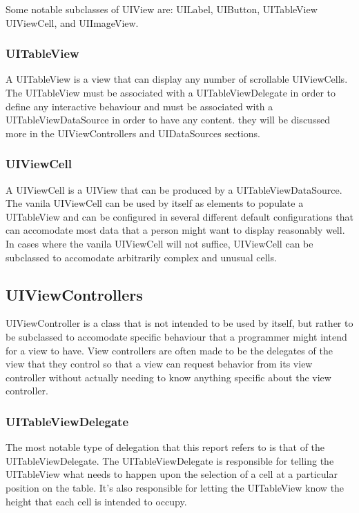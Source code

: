\documentclass[se]{uw-wkrpt}
\begin{document}
Some notable subclasses of UIView are: UILabel, UIButton, UITableView
UIViewCell, and UIImageView.

\subsubsection{UITableView}

A UITableView is a view that can display any number of scrollable 
UIViewCells. The UITableView must be associated with a UITableViewDelegate
in order to define any interactive behaviour and must be associated
with a UITableViewDataSource in order to have any content. they will be
discussed more in the UIViewControllers and UIDataSources sections.

\subsubsection{UIViewCell}

A UIViewCell is a UIView that can be produced by a UITableViewDataSource.
The vanila UIViewCell can be used by itself as elements to populate a
UITableView and can be configured in several different default configurations
that can accomodate most data that a person might want to display reasonably
well. In cases where the vanila UIViewCell will not suffice, UIViewCell can
be subclassed to accomodate arbitrarily complex and unusual cells.

\subsection{UIViewControllers}

UIViewController is a class that is not intended to be used by itself, 
but rather to be subclassed to accomodate specific behaviour that
a programmer might intend for a view to have. View controllers are
often made to be the delegates of the view that they control so that
a view can request behavior from its view controller without actually
needing to know anything specific about the view controller. 

\subsubsection{UITableViewDelegate}

The most notable type of delegation that this report refers to is
that of the UITableViewDelegate. The UITableViewDelegate is responsible
for telling the UITableView what needs to happen upon the selection of
a cell at a particular position on the table. It's also responsible for 
letting the UITableView know the height that each cell is intended to
occupy.
\end{document}

